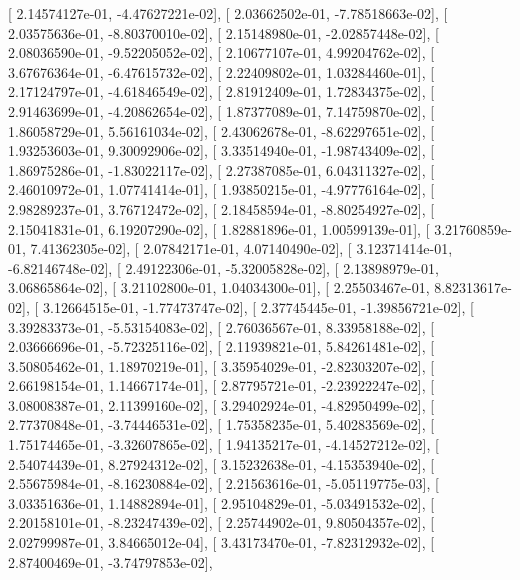 \documentclass{article}
\begin{document}
       [  2.14574127e-01,  -4.47627221e-02],
       [  2.03662502e-01,  -7.78518663e-02],
       [  2.03575636e-01,  -8.80370010e-02],
       [  2.15148980e-01,  -2.02857448e-02],
       [  2.08036590e-01,  -9.52205052e-02],
       [  2.10677107e-01,   4.99204762e-02],
       [  3.67676364e-01,  -6.47615732e-02],
       [  2.22409802e-01,   1.03284460e-01],
       [  2.17124797e-01,  -4.61846549e-02],
       [  2.81912409e-01,   1.72834375e-02],
       [  2.91463699e-01,  -4.20862654e-02],
       [  1.87377089e-01,   7.14759870e-02],
       [  1.86058729e-01,   5.56161034e-02],
       [  2.43062678e-01,  -8.62297651e-02],
       [  1.93253603e-01,   9.30092906e-02],
       [  3.33514940e-01,  -1.98743409e-02],
       [  1.86975286e-01,  -1.83022117e-02],
       [  2.27387085e-01,   6.04311327e-02],
       [  2.46010972e-01,   1.07741414e-01],
       [  1.93850215e-01,  -4.97776164e-02],
       [  2.98289237e-01,   3.76712472e-02],
       [  2.18458594e-01,  -8.80254927e-02],
       [  2.15041831e-01,   6.19207290e-02],
       [  1.82881896e-01,   1.00599139e-01],
       [  3.21760859e-01,   7.41362305e-02],
       [  2.07842171e-01,   4.07140490e-02],
       [  3.12371414e-01,  -6.82146748e-02],
       [  2.49122306e-01,  -5.32005828e-02],
       [  2.13898979e-01,   3.06865864e-02],
       [  3.21102800e-01,   1.04034300e-01],
       [  2.25503467e-01,   8.82313617e-02],
       [  3.12664515e-01,  -1.77473747e-02],
       [  2.37745445e-01,  -1.39856721e-02],
       [  3.39283373e-01,  -5.53154083e-02],
       [  2.76036567e-01,   8.33958188e-02],
       [  2.03666696e-01,  -5.72325116e-02],
       [  2.11939821e-01,   5.84261481e-02],
       [  3.50805462e-01,   1.18970219e-01],
       [  3.35954029e-01,  -2.82303207e-02],
       [  2.66198154e-01,   1.14667174e-01],
       [  2.87795721e-01,  -2.23922247e-02],
       [  3.08008387e-01,   2.11399160e-02],
       [  3.29402924e-01,  -4.82950499e-02],
       [  2.77370848e-01,  -3.74446531e-02],
       [  1.75358235e-01,   5.40283569e-02],
       [  1.75174465e-01,  -3.32607865e-02],
       [  1.94135217e-01,  -4.14527212e-02],
       [  2.54074439e-01,   8.27924312e-02],
       [  3.15232638e-01,  -4.15353940e-02],
       [  2.55675984e-01,  -8.16230884e-02],
       [  2.21563616e-01,  -5.05119775e-03],
       [  3.03351636e-01,   1.14882894e-01],
       [  2.95104829e-01,  -5.03491532e-02],
       [  2.20158101e-01,  -8.23247439e-02],
       [  2.25744902e-01,   9.80504357e-02],
       [  2.02799987e-01,   3.84665012e-04],
       [  3.43173470e-01,  -7.82312932e-02],
       [  2.87400469e-01,  -3.74797853e-02],
\end{document}
